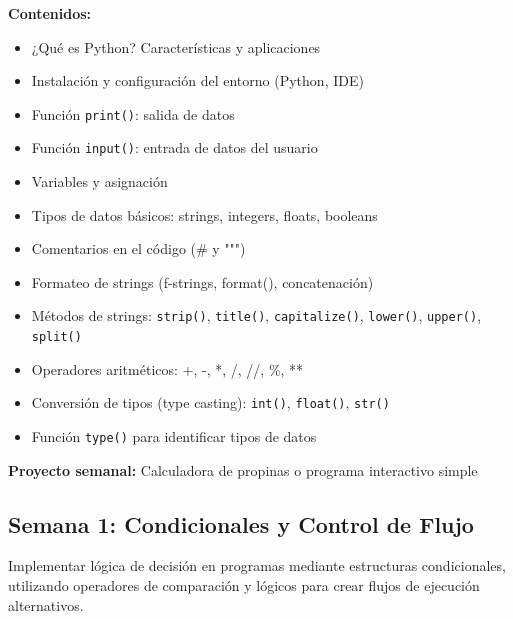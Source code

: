 \documentclass[12pt,letterpaper]{article}
\begin{document}
\textbf{Contenidos:}
\begin{itemize}[leftmargin=*]
    \item ¿Qué es Python? Características y aplicaciones
    \item Instalación y configuración del entorno (Python, IDE)
    \item Función \texttt{print()}: salida de datos
    \item Función \texttt{input()}: entrada de datos del usuario
    \item Variables y asignación
    \item Tipos de datos básicos: strings, integers, floats, booleans
    \item Comentarios en el código (\# y """)
    \item Formateo de strings (f-strings, format(), concatenación)
    \item Métodos de strings: \texttt{strip()}, \texttt{title()}, \texttt{capitalize()}, \texttt{lower()}, \texttt{upper()}, \texttt{split()}
    \item Operadores aritméticos: +, -, *, /, //, \%, **
    \item Conversión de tipos (type casting): \texttt{int()}, \texttt{float()}, \texttt{str()}
    \item Función \texttt{type()} para identificar tipos de datos
\end{itemize}

\textbf{Proyecto semanal:} Calculadora de propinas o programa interactivo simple

\subsection{Semana 1: Condicionales y Control de Flujo}

\begin{objetivobox}
Implementar lógica de decisión en programas mediante estructuras condicionales, utilizando operadores de comparación y lógicos para crear flujos de ejecución alternativos.
\end{objetivobox}
\end{document}
